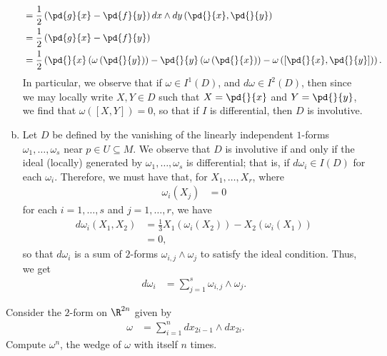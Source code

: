 \documentclass[10pt]{mypackage}
\begin{document}
\begin{solution}
\begin{enumerate}[(a)]
\begin{align*}
                                  &= \frac{1}{2} \left( \pd{g}{x} - \pd{f}{y} \right) dx\wedge dy\left( \pd{}{x},\pd{}{y} \right)\\
                                  &= \frac{1}{2}\left( \pd{g}{x} - \pd{f}{y} \right)\\
                                  &= \frac{1}{2}\left( \pd{}{x}\left(\omega\left( \pd{}{y} \right)\right) - \pd{}{y}\left( \omega\left( \pd{}{x} \right) \right) - \omega\left( \left[ \pd{}{x},\pd{}{y} \right] \right) \right).
      \end{align*}
      In particular, we observe that if $\omega\in I^{1}\left( D \right)$, and $d\omega\in I^{2}\left( D \right)$, then since we may locally write $X,Y\in D$ such that $ X = \pd{}{x} $ and $ Y = \pd{}{y} $, we find that $ \omega\left( \left[ X,Y \right] \right) = 0 $, so that if $I$ is differential, then $D$ is involutive.
    \item Let $D$ be defined by the vanishing of the linearly independent $1$-forms $\omega_1,\dots,\omega_s$ near $p\in U\subseteq M$. We observe that $D$ is involutive if and only if the ideal (locally) generated by $\omega_1,\dots,\omega_s$ is differential; that is, if $d\omega_i\in I(D)$ for each $\omega_i$. Therefore, we must have that, for $X_1,\dots,X_r$, where
      \begin{align*}
        \omega_i\left( X_j \right) &= 0
      \end{align*}
      for each $i=1,\dots,s$ and $ j = 1,\dots,r $, we have
      \begin{align*}
        d\omega_i\left( X_1,X_2 \right) &= \frac{1}{3} X_1\left( \omega_i\left( X_2 \right) \right) - X_2\left( \omega_i\left( X_1 \right) \right)\\
                                        &= 0,
      \end{align*}
      so that $d\omega_i$ is a sum of $2$-forms $\omega_{i,j}\wedge \omega_j$ to satisfy the ideal condition. Thus, we get
      \begin{align*}
        d\omega_i &= \sum_{j=1}^{s}\omega_{i,j}\wedge \omega_j.
      \end{align*}
  \end{enumerate}
\end{solution}
\begin{problem}[Problem 5]
  Consider the $2$-form on $\R^{2n}$ given by
  \begin{align*}
    \omega &= \sum_{i=1}^{n} dx_{2i-1}\wedge dx_{2i}.
  \end{align*}
  Compute $\omega^{n}$, the wedge of $\omega$ with itself $n$ times.
\end{problem}
\end{document}
